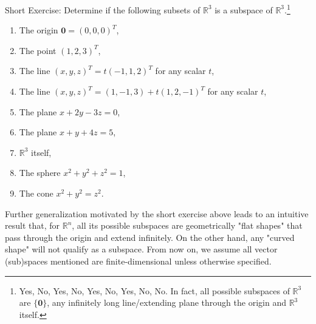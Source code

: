 Short Exercise: Determine if the following subsets of $\mathbb{R}^3$ is a subspace of $\mathbb{R}^3$.\footnote{Yes, No, Yes, No, Yes, No, Yes, No, No. In fact, all possible subspaces of $\mathbb{R}^3$ are $\{\textbf{0}\}$, any infinitely long line/extending plane through the origin and $\mathbb{R}^3$ itself.}
\begin{enumerate}[label=(\alph*)]
\item The origin $\textbf{0} = (0,0,0)^T$,
\item The point $(1,2,3)^T$,
\item The line $(x,y,z)^T = t(-1, 1, 2)^T$ for any scalar $t$,
\item The line $(x,y,z)^T = (1, -1, 3) + t(1, 2, -1)^T$ for any scalar $t$,
\item The plane $x + 2y - 3z = 0$,
\item The plane $x + y + 4z = 5$,
\item $\mathbb{R}^3$ itself,
\item The sphere $x^2 + y^2 + z^2 = 1$,
\item The cone $x^2 + y^2 = z^2$.
\end{enumerate}
Further generalization motivated by the short exercise above leads to an intuitive result that, for $\mathbb{R}^n$, all its possible subspaces are geometrically "flat shapes" that pass through the origin and extend infinitely. On the other hand, any "curved shape" will not qualify as a subspace. From now on, we assume all vector (sub)spaces mentioned are finite-dimensional unless otherwise specified.

